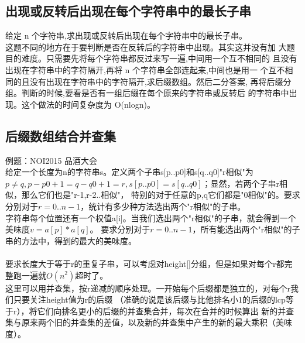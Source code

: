     \subsection{出现或反转后出现在每个字符串中的最长子串}
        给定 n 个字符串,求出现或反转后出现在每个字符串中的最长子串。\\
        这题不同的地方在于要判断是否在反转后的字符串中出现。其实这并没有加
        大题目的难度。只需要先将每个字符串都反过来写一遍,中间用一个互不相同的
        且没有出现在字符串中的字符隔开,再将 n 个字符串全部连起来,中间也是用一
        个互不相同的且没有出现在字符串中的字符隔开,求后缀数组。然后二分答案,
        再将后缀分组。判断的时候,要看是否有一组后缀在每个原来的字符串或反转后
        的字符串中出现。这个做法的时间复杂度为 O(nlogn)。
    \subsection{后缀数组结合并查集}
        例题：NOI2015 品酒大会\\
        给定一个长度为n的字符串s。定义两个子串s[p..p0]和s[q..q0]"r相似"为
        $p\neq q, p-p0+1=q-q0+1=r, s[p..p0]=s[q..q0]$；显然，若两个子串r相似，那么它们也是"r-1,r-2..相似"，
        特别的对于任意的p,q它们都是"0相似"的。要求分别对于$r=0..n-1$，统计有多少种方法选出两个"r相似"的子串。\\
        字符串每个位置还有一个权值a[i]。当我们选出两个"r相似"的子串，就会得到一个美味度$v=a[p]*a[q]$。
        要求分别对于$r=0..n-1$，所有能选出两个"r相似"的子串的方法中，得到的最大的美味度。\\\\
        要求长度大于等于r的重复子串，可以考虑对height[]分组，但是如果对每个r都完整跑一遍就$O(n^2)$超时了。\\
        这里可以用并查集，按r递减的顺序处理。一开始每个后缀都是独立的，对每个r我们只要关注height值为r的后缀
        （准确的说是该后缀与比他排名小1的后缀的lcp等于r），将它们向排名更小的后缀的并查集合并，每次在合并的时候算出
        新的并查集与原来两个旧的并查集的差值，以及新的并查集中产生的新的最大乘积（美味度）。
